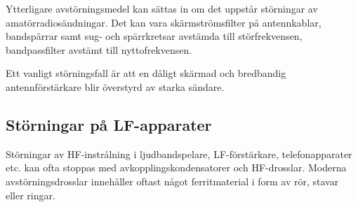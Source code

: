 Ytterligare avstörningsmedel kan sättas in om det uppstår störningar
av amatörradiosändningar. Det kan vara skärmströmsfilter på
antennkablar, bandspärrar samt sug- och spärrkretsar avstämda till
störfrekvensen, bandpassfilter avstämt till nyttofrekvensen.

Ett vanligt störningsfall är att en dåligt skärmad och bredbandig
antennförstärkare blir överstyrd av starka sändare.

\subsection{Störningar på LF-apparater}

Störningar av HF-instrålning i ljudbandspelare, LF-förstärkare,
telefonapparater etc. kan ofta stoppas med avkopplingskondensatorer
och HF-drosslar. Moderna avstörningsdrosslar innehåller oftast något
ferritmaterial i form av rör, stavar eller ringar.
